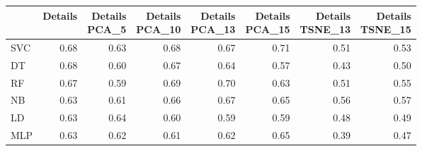 \documentclass[12pt,italian]{report}
\begin{document}
\begin{table}[h]
	\begin{center}
		\begin{adjustbox}{max width=\textwidth, max totalheight= {4cm}}
			\begin{tabular}{lrrrrrrr}
				\toprule
				{} &   Details &  \thead{Details\\PCA\_5} & \thead{Details\\ PCA\_10} &  \thead{Details\\ PCA\_13} &  \thead{Details\\PCA\_15} &  \thead{Details\\TSNE\_13} &  \thead{Details\\TSNE\_15} \\
				\midrule
				SVC &  0.68 &                  0.63 &                   0.68 &                   0.67 &                   0.71 &                    0.51 &                    0.53 \\
				DT  &  0.68 &                  0.60 &                   0.67 &                   0.64 &                   0.57 &                    0.43 &                    0.50 \\
				RF  &  0.67 &                  0.59 &                   0.69 &                   0.70 &                   0.63 &                    0.51 &                    0.55 \\
				NB  &  0.63 &                  0.61 &                   0.66 &                   0.67 &                   0.65 &                    0.56 &                    0.57 \\
				LD  &  0.63 &                  0.64 &                   0.60 &                   0.59 &                   0.59 &                    0.48 &                    0.49 \\
				MLP &  0.63 &                  0.62 &                   0.61 &                   0.62 &                   0.65 &                    0.39 &                    0.47 \\
				\bottomrule
			\end{tabular}
		\end{adjustbox}
	\end{center}
\end{table}
\end{document}
